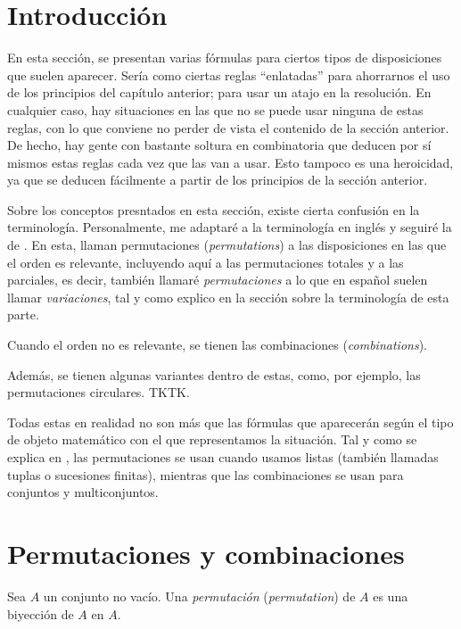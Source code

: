 



\section{Introducción}

En esta sección, se presentan varias fórmulas para ciertos tipos de
disposiciones que suelen aparecer. Sería como ciertas reglas ``enlatadas''
para ahorrarnos el uso de los principios del capítulo anterior; para usar un
atajo en la resolución. En cualquier caso, hay situaciones en las que no se
puede usar ninguna de estas reglas, con lo que conviene no perder de vista
el contenido de la sección anterior. De hecho, hay gente con bastante
soltura en combinatoria que deducen por sí mismos estas reglas cada vez que
las van a usar. Esto tampoco es una heroicidad, ya que se deducen fácilmente
a partir de los principios de la sección anterior.

Sobre los conceptos presntados en esta sección, existe cierta confusión en
la terminología. Personalmente, me adaptaré a la terminología en inglés y
seguiré la de \cite{brualdi}. En esta, llaman permutaciones
(\emph{permutations}) a las disposiciones en las que el orden es relevante,
incluyendo aquí a las permutaciones totales y a las parciales, es decir,
también llamaré \emph{permutaciones} a lo que en español suelen llamar
\emph{variaciones}, tal y como explico en la sección sobre la terminología de
esta parte.

Cuando el orden no es relevante, se tienen las combinaciones
(\emph{combinations}).

Además, se tienen algunas variantes dentro de estas, como, por ejemplo, las
permutaciones circulares. TKTK.

Todas estas en realidad no son más que las fórmulas que aparecerán según el
tipo de objeto matemático con el que representamos la situación. Tal y como
se explica en \cite{brualdi}, las permutaciones se usan cuando usamos listas
(también llamadas tuplas o sucesiones finitas), mientras que las
combinaciones se usan para conjuntos y multiconjuntos.






\section{Permutaciones y combinaciones}

\begin{deffinition}
  Sea $A$ un conjunto no vacío. Una \emph{permutación} (\emph{permutation}) de
  $A$ es una biyección de $A$ en $A$.
\end{deffinition}

